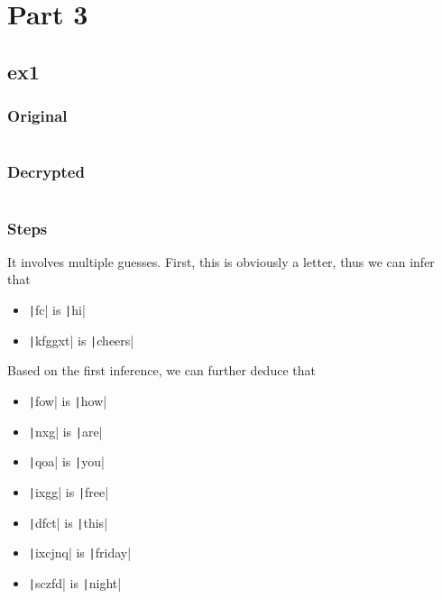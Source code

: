 \documentclass[12pt]{article}
\begin{document}
\section{Part 3}

\subsection{ex1}

\subsubsection{Original}

\inputminted{text}{exercise/ex1.enc}

\subsubsection{Decrypted}

\inputminted{text}{exercise/ex1.dec}

\subsubsection{Steps}

It involves multiple guesses. First, this is obviously a letter, thus we can infer that

\begin{itemize}
  \item \texttt|fc| is \texttt|hi|
  \item \texttt|kfggxt| is \texttt|cheers|
\end{itemize}

Based on the first inference, we can further deduce that

\begin{itemize}
  \item \texttt|fow| is \texttt|how|
  \item \texttt|nxg| is \texttt|are|
  \item \texttt|qoa| is \texttt|you|
  \item \texttt|ixgg| is \texttt|free|
  \item \texttt|dfct| is \texttt|this|
  \item \texttt|ixcjnq| is \texttt|friday|
  \item \texttt|sczfd| is \texttt|night|
\end{itemize}
\end{document}
